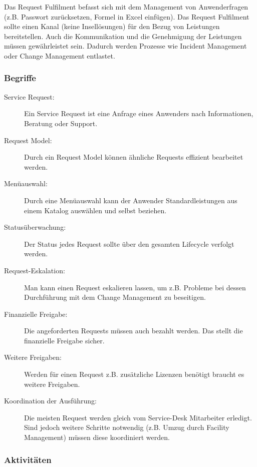 Das Request Fulfilment befasst sich mit dem Management von Anwenderfragen (z.B. Passwort zurücksetzen, Formel in Excel einfügen). Das Request Fulfilment sollte einen Kanal (keine Insellösungen) für den Bezug von Leistungen bereitstellen. Auch die Kommunikation und die Genehmigung der Leistungen müssen gewährleistet sein. Dadurch werden Prozesse wie Incident Management oder Change Management entlastet.

\subsubsection{Begriffe}

\begin{description}
	\item[Service Request:] Ein Service Request ist eine Anfrage eines Anwenders nach Informationen, Beratung oder Support.
	\item[Request Model:] Durch ein Request Model können ähnliche Requests effizient bearbeitet werden.
	\item[Menüauswahl:] Durch eine Menüauswahl kann der Anwender Standardleistungen aus einem Katalog auswählen und selbst beziehen.
	\item[Statusüberwachung:] Der Status jedes Request sollte über den gesamten Lifecycle verfolgt werden.
	\item[Request-Eskalation:] Man kann einen Request eskalieren lassen, um z.B. Probleme bei dessen Durchführung mit dem Change Management zu beseitigen.
	\item[Finanzielle Freigabe:] Die angeforderten Requests müssen auch bezahlt werden. Das stellt die finanzielle Freigabe sicher.
	\item[Weitere Freigaben:] Werden für einen Request z.B. zusätzliche Lizenzen benötigt braucht es weitere Freigaben.
	\item[Koordination der Ausführung:] Die meisten Request werden gleich vom Service-Desk Mitarbeiter erledigt. Sind jedoch weitere Schritte notwendig (z.B. Umzug durch Facility Management) müssen diese koordiniert werden.
\end{description}

\subsubsection{Aktivitäten}

